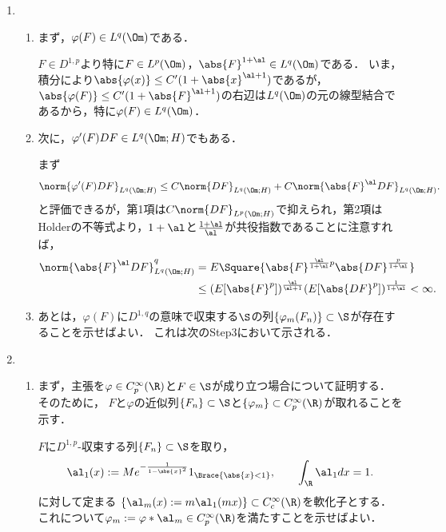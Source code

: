 \documentclass[uplatex,dvipdfmx]{jsreport}
\begin{document}
\begin{Proof}\mbox{}
    \begin{enumerate}
        \item \begin{enumerate}[{Step}1]
            \item まず，$\varphi(F)\in L^q(\Om)$である．
            \begin{Proof}[【証】]\renewcommand{\qedsymbol}{$\Box$}
                $F\in D^{1,p}$より特に$F\in L^p(\Om)$，$\abs{F}^{1+\al}\in L^q(\Om)$である．
                いま，積分により$\abs{\varphi(x)}\le C'(1+\abs{x}^{\al+1})$であるが，$\abs{\varphi(F)}\le C'(1+\abs{F}^{\al+1})$の右辺は$L^q(\Om)$の元の線型結合であるから，特に$\varphi(F)\in L^q(\Om)$．
            \end{Proof}
            \item 次に，$\varphi'(F)DF\in L^q(\Om;H)$でもある．
            \begin{Proof}[【証】]\renewcommand{\qedsymbol}{$\Box$}
                まず
                \[\norm{\varphi'(F)DF}_{L^q(\Om;H)}\le C\norm{DF}_{L^q(\Om;H)}+C\norm{\abs{F}^\al DF}_{L^q(\Om;H)}.\]
                と評価できるが，第1項は$C\norm{DF}_{L^p(\Om;H)}$で抑えられ，第2項はHolderの不等式より，$1+\al$と$\frac{1+\al}{\al}$が共役指数であることに注意すれば，
                \begin{align*}
                    \norm{\abs{F}^\al DF}_{L^q(\Om;H)}^q&=E\Square{\abs{F}^{\frac{\al}{1+\al}p}\abs{DF}^{\frac{p}{1+\al}}}\\
                    &\le (E[\abs{F}^p])^{\frac{\al}{\al+1}}(E[\abs{DF}^p])^{\frac{1}{1+\al}}<\infty.
                \end{align*}
            \end{Proof}
            \item あとは，$\varphi(F)$に$D^{1,q}$の意味で収束する$\S$の列$\{\varphi_m(F_n)\}\subset\S$が存在することを示せばよい．
            これは次のStep3において示される．
        \end{enumerate}
        \item \begin{enumerate}[{Step}1]
            \item まず，主張を$\varphi\in C_p^\infty(\R)$と$F\in\S$が成り立つ場合について証明する．
            そのために，
            $F$と$\varphi$の近似列$\{F_n\}\subset\S$と$\{\varphi_m\}\subset C_p^\infty(\R)$が取れることを示す．
            \begin{Proof}[【証】]\renewcommand{\qedsymbol}{$\Box$}
                $F$に$D^{1,p}$-収束する列$\{F_n\}\subset\S$を取り，
                \[\al_1(x):=Me^{-\frac{1}{1-\abs{x}^2}}1_{\Brace{\abs{x}<1}},\qquad\int_\R\al_1dx=1.\]
                に対して定まる
                $\{\al_m(x):=m\al_1(mx)\}\subset C^\infty_c(\R)$を軟化子とする．
                これについて$\varphi_m:=\varphi*\al_m\in C^\infty_p(\R)$を満たすことを示せばよい．
                

\end{Proof}
\end{enumerate}
\end{enumerate}
\end{Proof}
\end{document}
